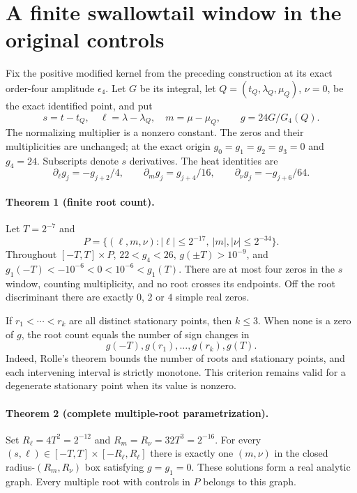 \section{A finite swallowtail window in the original controls}

Fix the positive modified kernel from the preceding construction at
its exact order-four amplitude $\epsilon_4$. Let $G$ be its integral,
let $Q=(t_Q,\lambda_Q,\mu_Q)$, $\nu=0$, be the exact identified point,
and put
\[
 s=t-t_Q,\quad \ell=\lambda-\lambda_Q,\quad m=\mu-\mu_Q,
 \qquad g=24G/G_4(Q).
\]
The normalizing multiplier is a nonzero constant. The zeros and their
multiplicities are unchanged; at the exact origin
$g_0=g_1=g_2=g_3=0$ and $g_4=24$. Subscripts denote $s$ derivatives.
The heat identities are
\[
 \partial_\ell g_j=-g_{j+2}/4,\qquad
 \partial_m g_j=g_{j+4}/16,\qquad
 \partial_\nu g_j=-g_{j+6}/64.
\]

\paragraph{Theorem 1 (finite root count).}
Let $T=2^{-7}$ and
\[
 P=\{(\ell,m,\nu): |\ell|\leq2^{-17},\ |m|,|\nu|\leq2^{-34}\}.
\]
Throughout $[-T,T]\times P$, $22<g_4<26$,
$g(\pm T)>10^{-9}$, and
$g_1(-T)<-10^{-6}<0<10^{-6}<g_1(T)$.
There are at most four zeros in the $s$ window, counting multiplicity,
and no root crosses its endpoints. Off the root discriminant there
are exactly $0$, $2$ or $4$ simple real zeros.

If $r_1<\cdots<r_k$ are all distinct stationary points, then $k\leq3$.
When none is a zero of $g$, the root count equals the number of sign
changes in
\[
 g(-T),g(r_1),\ldots,g(r_k),g(T).
\]
Indeed, Rolle's theorem bounds the number of roots and stationary
points, and each intervening interval is strictly monotone. This
criterion remains valid for a degenerate stationary point when its
value is nonzero.

\paragraph{Theorem 2 (complete multiple-root parametrization).}
Set $R_\ell=4T^2=2^{-12}$ and $R_m=R_\nu=32T^3=2^{-16}$.
For every $(s,\ell)\in[-T,T]\times[-R_\ell,R_\ell]$ there is
exactly one $(m,\nu)$ in the closed radius-$(R_m,R_\nu)$ box
satisfying $g=g_1=0$. These solutions form a real analytic graph.
Every multiple root with controls in $P$ belongs to this graph.

